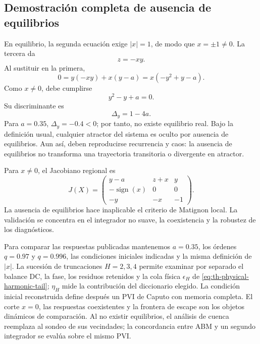 \subsection{Demostración completa de ausencia de equilibrios}

En equilibrio, la segunda ecuación exige \(|x|=1\), de modo que
\(x=\pm1\neq0\). La tercera da
\[
 z=-xy.
\]
Al sustituir en la primera,
\[
 0=y(-xy)+x(y-a)
 =x(-y^2+y-a).
\]
Como \(x\neq0\), debe cumplirse
\begin{equation}
 y^2-y+a=0.
 \label{eq:cand-munoz-equilibrium}
\end{equation}
Su discriminante es
\[
 \Delta_y=1-4a.
\]
Para \(a=0.35\), \(\Delta_y=-0.4<0\); por tanto, no existe equilibrio real.
Bajo la definición usual,
cualquier atractor del sistema es oculto por ausencia de equilibrios. Aun así,
deben reproducirse recurrencia y caos: la ausencia de equilibrios no transforma
una trayectoria transitoria o divergente en atractor.

Para \(x\neq0\), el Jacobiano regional es
\begin{equation}
 J(X)=
 \begin{pmatrix}
 y-a&z+x&y\\
 -\operatorname{sign}(x)&0&0\\
 -y&-x&-1
 \end{pmatrix}.
 \label{eq:cand-munoz-jacobian}
\end{equation}
La ausencia de equilibrios hace inaplicable el criterio de Matignon local. La
validación se concentra en el integrador no suave, la coexistencia y la
robustez de los diagnósticos.

\begin{proposalbox}
Para comparar las respuestas publicadas mantenemos \(a=0.35\), los órdenes
\(q=0.97\) y \(q=0.996\), las condiciones iniciales indicadas y la misma
definición de \(|x|\). La sucesión de truncaciones \(H=2,3,4\) permite
examinar por separado el balance DC, la fase, los residuos retenidos y la
cola física \(\epsilon_H\) de \cref{eq:th-physical-harmonic-tail};
\(\eta_H\) mide la contribución del diccionario elegido. La condición inicial
reconstruida define después un PVI de Caputo con memoria completa. El corte
\(x=0\), las respuestas coexistentes y la frontera de escape son los objetos
dinámicos de comparación. Al no existir equilibrios, el análisis de cuenca
reemplaza al sondeo de sus vecindades; la concordancia entre ABM y un segundo
integrador se evalúa sobre el mismo PVI.
\end{proposalbox}


